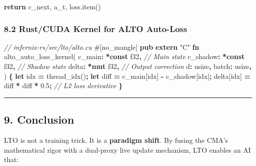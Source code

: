 \documentclass[
  11pt,
  a4paper,
]{article}
\newenvironment{Shaded}{\begin{snugshade}}{\end{snugshade}}
\newcommand{\AttributeTok}[1]{\textcolor[rgb]{0.13,0.29,0.53}{#1}}
\newcommand{\CommentTok}[1]{\textcolor[rgb]{0.56,0.35,0.01}{\textit{#1}}}
\newcommand{\ControlFlowTok}[1]{\textcolor[rgb]{0.13,0.29,0.53}{\textbf{#1}}}
\newcommand{\DataTypeTok}[1]{\textcolor[rgb]{0.13,0.29,0.53}{#1}}
\newcommand{\DecValTok}[1]{\textcolor[rgb]{0.00,0.00,0.81}{#1}}
\newcommand{\KeywordTok}[1]{\textcolor[rgb]{0.13,0.29,0.53}{\textbf{#1}}}
\newcommand{\NormalTok}[1]{#1}
\newcommand{\OperatorTok}[1]{\textcolor[rgb]{0.81,0.36,0.00}{\textbf{#1}}}
\newcommand{\StringTok}[1]{\textcolor[rgb]{0.31,0.60,0.02}{#1}}
\begin{document}
\begin{Shaded}
\begin{Highlighting}[]
        \ControlFlowTok{return}\NormalTok{ c\_next, a\_t, loss.item()}
\end{Highlighting}
\end{Shaded}

\subsubsection{8.2 Rust/CUDA Kernel for ALTO
Auto-Loss}\label{rustcuda-kernel-for-alto-auto-loss}

\begin{Shaded}
\begin{Highlighting}[]
\CommentTok{// infernix{-}rs/src/lto/alto.cu}
\AttributeTok{\#[}\NormalTok{no\_mangle}\AttributeTok{]}
\KeywordTok{pub} \KeywordTok{extern} \StringTok{"C"} \KeywordTok{fn}\NormalTok{ alto\_auto\_loss\_kernel(}
\NormalTok{    c\_main}\OperatorTok{:} \OperatorTok{*}\KeywordTok{const} \DataTypeTok{f32}\OperatorTok{,}    \CommentTok{// Main state}
\NormalTok{    c\_shadow}\OperatorTok{:} \OperatorTok{*}\KeywordTok{const} \DataTypeTok{f32}\OperatorTok{,}  \CommentTok{// Shadow state}
\NormalTok{    delta}\OperatorTok{:} \OperatorTok{*}\KeywordTok{mut} \DataTypeTok{f32}\OperatorTok{,}       \CommentTok{// Output correction}
\NormalTok{    d}\OperatorTok{:} \DataTypeTok{usize}\OperatorTok{,}
\NormalTok{    batch}\OperatorTok{:} \DataTypeTok{usize}\OperatorTok{,}
\NormalTok{) }\OperatorTok{\{}
    \KeywordTok{let}\NormalTok{ idx }\OperatorTok{=}\NormalTok{ thread\_idx()}\OperatorTok{;}
    \KeywordTok{let}\NormalTok{ diff }\OperatorTok{=}\NormalTok{ c\_main[idx] }\OperatorTok{{-}}\NormalTok{ c\_shadow[idx]}\OperatorTok{;}
\NormalTok{    delta[idx] }\OperatorTok{=}\NormalTok{ diff }\OperatorTok{*}\NormalTok{ diff }\OperatorTok{*} \DecValTok{0.5}\OperatorTok{;} \CommentTok{// L2 loss derivative}
\OperatorTok{\}}
\end{Highlighting}
\end{Shaded}

\begin{center}\rule{0.5\linewidth}{0.5pt}\end{center}

\subsection{9. Conclusion}\label{conclusion}

LTO is not a training trick. It is a \textbf{paradigm shift}. By fusing
the CMA's mathematical rigor with a dual-proxy live update mechanism,
LTO enables an AI that:
\end{document}
